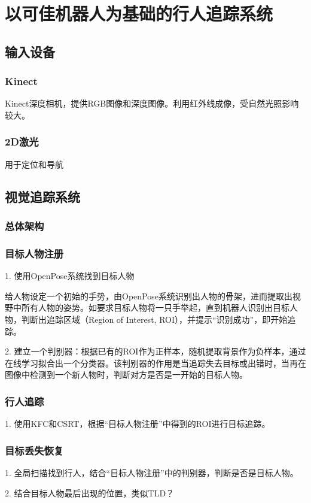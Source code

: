 
\chapter{以可佳机器人为基础的行人追踪系统}

\section{输入设备}

\subsection{Kinect}

Kinect深度相机，提供RGB图像和深度图像。利用红外线成像，受自然光照影响较大。

\subsection{2D激光}

用于定位和导航

\section{视觉追踪系统}

\subsection{总体架构}

\subsection{目标人物注册}
1. 使用OpenPose系统找到目标人物

给人物设定一个初始的手势，由OpenPose系统识别出人物的骨架，进而提取出视野中所有人物的姿势。如要求目标人物将一只手举起，直到机器人识别出目标人物，判断出追踪区域（Region of Interest, ROI），并提示“识别成功”，即开始追踪。

2. 建立一个判别器：根据已有的ROI作为正样本，随机提取背景作为负样本，通过在线学习拟合出一个分类器。该判别器的作用是当追踪失去目标或出错时，当再在图像中检测到一个新人物时，判断对方是否是一开始的目标人物。

\subsection{行人追踪}

1. 使用KFC和CSRT，根据“目标人物注册”中得到的ROI进行目标追踪。

\subsection{目标丢失恢复}

1. 全局扫描找到行人，结合“目标人物注册”中的判别器，判断是否是目标人物。

2. 结合目标人物最后出现的位置，类似TLD？

